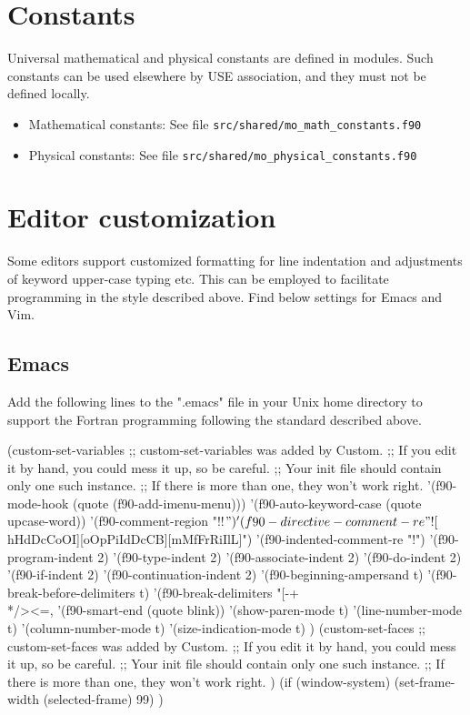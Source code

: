 \documentclass[a4paper,11pt,DIV16,BCOR1cm,titlepage]{scrartcl}
\begin{document}
\begin{appendix}
\section{Constants}\label{app_cn}  
%
Universal mathematical and physical constants are defined in modules. Such constants 
can be used elsewhere by USE association, and they must not be defined locally.
\begin{itemize}
\item Mathematical constants: See file \texttt{src/shared/mo\_math\_constants.f90}
\item Physical constants: See file \texttt{src/shared/mo\_physical\_constants.f90}
\end{itemize}

\section{Editor customization}\label{sec:editor_help}
%
Some editors support customized formatting for line indentation and adjustments of keyword 
upper-case typing etc. This can be employed to facilitate programming in the style described 
above. Find below settings for Emacs and Vim. 
%
\subsection{Emacs}
Add the following lines to the ".emacs" file in your Unix home directory to support the Fortran
programming following the standard described above. 
\begin{lisp}
(custom-set-variables
  ;; custom-set-variables was added by Custom.
  ;; If you edit it by hand, you could mess it up, so be careful.
  ;; Your init file should contain only one such instance.
  ;; If there is more than one, they won't work right.
 '(f90-mode-hook (quote (f90-add-imenu-menu)))
 '(f90-auto-keyword-case (quote upcase-word))
 '(f90-comment-region "!!$")
 '(f90-directive-comment-re "![\\$hHdDcCoOI][oOpPiIdDcCB][mMfFrRiIlL]")
 '(f90-indented-comment-re "!")
 '(f90-program-indent 2)
 '(f90-type-indent 2)
 '(f90-associate-indent 2)
 '(f90-do-indent 2)
 '(f90-if-indent 2)
 '(f90-continuation-indent 2)
 '(f90-beginning-ampersand t)
 '(f90-break-before-delimiters t)
 '(f90-break-delimiters "[-+\\*/><=,%
 '(f90-smart-end (quote blink))
 '(show-paren-mode t)
 '(line-number-mode t)
 '(column-number-mode t)
 '(size-indication-mode t)
)
(custom-set-faces
  ;; custom-set-faces was added by Custom.
  ;; If you edit it by hand, you could mess it up, so be careful.
  ;; Your init file should contain only one such instance.
  ;; If there is more than one, they won't work right.
 )
(if (window-system)
    (set-frame-width (selected-frame) 99)
)
\end{lisp}
%

\end{appendix}
\end{document}
